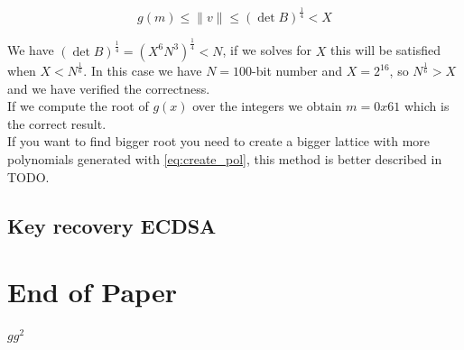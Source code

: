 \documentclass[a4paper,12pt]{report}
\begin{document}
\[
    g(m) \le \lVert v \rVert \le (\det B)^{\frac{1}{4}} < X
\] 

\vspace*{10px}

We have $(\det B)^{\frac{1}{4}} = (X^6N^3)^{\frac{1}{4}} < N$, if we solves for $X$ this will be satisfied when $X < N^{\frac{1}{6}}$.
In this case we have $N = 100$-bit number and $X = 2^{16}$, so $N^{\frac{1}{6}} > X$ and we have verified the correctness.\\

If we compute the root of $g(x)$ over the integers we obtain $m = 0x61$ which is the correct result.\\

If you want to find bigger root you need to create a bigger lattice with more polynomials generated with \ref{eq:create_pol},
this method is better described in TODO.

\section{Key recovery ECDSA}

\chapter*{End of Paper}

$gg^2$



\end{document}
